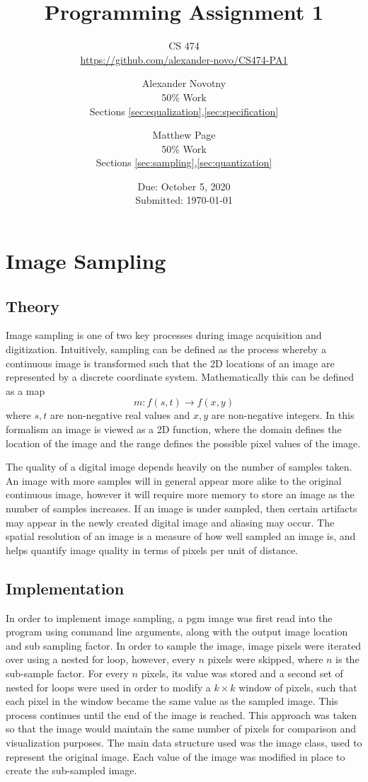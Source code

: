 \documentclass[headings=optiontoheadandtoc,listof=totoc,parskip=full]{scrartcl}
\title{Programming Assignment 1}
\subtitle{CS 474\\\url{https://github.com/alexander-novo/CS474-PA1}}
\author{Alexander Novotny\\50\% Work\\Sections \ref*{sec:equalization},\ref*{sec:specification} \and Matthew Page\\50\% Work\\Sections \ref*{sec:sampling},\ref*{sec:quantization}}
\date{Due: October 5, 2020 \\ Submitted: \today}
\begin{document}
\maketitle
\tableofcontents
{}

\newpage
{}

\section{Image Sampling}
\label{sec:sampling}

\subsection{Theory}
Image sampling is one of two key processes during image acquisition and digitization. Intuitively, sampling can be defined as the process whereby a continuous image is transformed such that the 2D locations of an image are represented by a discrete coordinate system. Mathematically this can be defined as a map \[
	m:f(s, t) \rightarrow f(x, y)
\]where $s, t$ are non-negative real values and $x, y$ are non-negative integers. In this formalism an image is viewed as a 2D function, where the domain defines the location of the image and the range defines the possible pixel values of the image.

The quality of a digital image depends heavily on the number of samples taken. An image with more samples will in general appear more alike to the original continuous image, however it will require more memory to store an image as the number of samples increases. If an image is under sampled, then certain artifacts may appear in the newly created digital image and aliasing may occur. The spatial resolution of an image is a measure of how well sampled an image is, and helps quantify image quality in terms of pixels per unit of distance.

\subsection{Implementation}
In order to implement image sampling, a pgm image was first read into the program using command line arguments, along with the output image location and sub sampling factor. In order to sample the image, image pixels were iterated over using a nested for loop, however, every $n$ pixels were skipped, where $n$ is the sub-sample factor. For every $n$ pixels, its value was stored and a second set of nested for loops were used in order to modify a $k \times k$ window of pixels, such that each pixel in the window became the same value as the sampled image. This process continues until the end of the image is reached. This approach was taken so that the image would maintain the same number of pixels for comparison and visualization purposes. The main data structure used was the image class, used to represent the original image. Each value of the image was modified in place to create the sub-sampled image.
\end{document}
